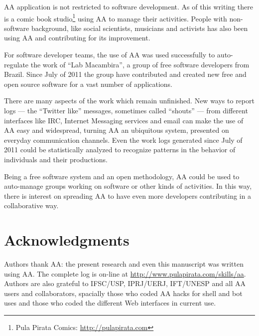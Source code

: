 \documentclass[letterpaper]{article}
\begin{document}
AA application is not restricted to software development. As of this writing
there is a comic book studio\footnote{Pula Pirata Comics: \url{http://pulapirata.com}}
using AA to manage their activities. People with non-software
background, like social scientists, musicians and activists has also been using AA
and contributing for its improvement.

For software developer teams, the use of AA was used successfully to auto-regulate the work
of ``Lab Macambira'', a group of free software developers from Brazil. Since
July of 2011 the group have contributed and created new free and open source
software for a vast number of applications.

There are many aspects of the work which remain unfinished. New ways to report
logs --- the ``Twitter like'' messages, sometimes called ``shouts'' --- from different interfaces like IRC,
Internet Messaging services and email can make the use of AA easy and
widespread, turning AA an ubiquitous system, presented on everyday communication
channels. Even the work logs generated since July of 2011 could be 
statistically analyzed to recognize patterns in the behavior of
individuals and their productions.

Being a free software
system and an open methodology, AA could be used to auto-manage groups
working on software or other kinds of activities. In this way,
there is interest on spreading AA to have even more developers
contributing in a collaborative way.

\section*{Acknowledgments}

Authors thank AA: the present research and even this manuscript was written using AA. The complete log is on-line at
\url{http://www.pulapirata.com/skills/aa}.
Authors are also grateful to IFSC/USP, IPRJ/UERJ, IFT/UNESP and all AA users and collaborators, spacially those who coded AA hacks for shell and bot uses and those who coded the different Web interfaces in current use.

\nocite{last2003}
\nocite{german2003}
\nocite{carmel1999}
\nocite{carmel2001}
\nocite{komi2005}
\nocite{battin2001}

%
%


\end{document}

